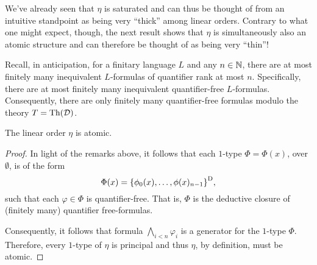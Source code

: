We've already seen that $\eta$ is saturated and can thus be thought of from an
intuitive standpoint as being very ``thick'' among linear orders.  Contrary to
what one might expect, though, the next result shows that $\eta$ is
simultaneously also an atomic structure and can therefore be thought of as being
very ``thin''!

Recall, in anticipation, for a finitary language $L$ and any $n\in\mathbb{N}$, there
are at most finitely many inequivalent $L$-formulas of quantifier rank at most
$n$. Specifically, there are at most finitely many inequivalent quantifier-free
$L$-formulas.  Consequently, there are only finitely many quantifier-free
formulas modulo the theory $T=\operatorname{Th}(\mathcal{D})$.

\begin{prp}
	The linear order $\eta$ is atomic.
\end{prp}
\begin{proof}
	In light of the remarks above, it follows that each $1$-type $\Phi=\Phi(x)$, over
	$\emptyset$, is of the form
	\begin{equation}
		\Phi(x) = {\left\lbrace \phi_{0}(x),\dotsc,\phi(x)_{n-1}\right\rbrace}^\mathrm{D},
	\end{equation}
	such that each $\varphi\in\Phi$ is quantifier-free.  That is, $\Phi$ is the
	deductive closure of (finitely many) quantifier free-formulas.

	Consequently, it follows that formula $\bigwedge_{i<n}\varphi_{i}$ is a
	generator for the $1$-type $\Phi$.  Therefore, every $1$-type of $\eta$ is
	principal and thus $\eta$, by definition, must be atomic.
\end{proof}

